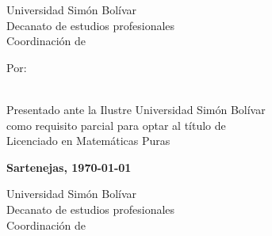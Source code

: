 \documentclass
[
  12pt,
  letterpaper,
  openany,
  oneside,
]{book}
\begin{document}
\frontmatter
\ifcaratula\newpage
\bgroup
    \centering
    \thispagestyle{empty}

    \PrintUsbLogo
    {
        { \normalfont\large Universidad Simón Bolívar }\\
        Decanato de estudios profesionales\\
        Coordinación de \coord
    }

    \vspace{4cm}

    \UppercaseBold{
        \wrapto[14cm][\centering]
        {\MainTitle}
    }

    \vspace{\fill}

    Por:
    \\
    \autor

    \vspace{\fill}

    \\
    Presentado ante la Ilustre Universidad Simón Bolívar\\
    como requisito parcial para optar al título de\\
    Licenciado en Matemáticas Puras

    \vspace{\fill}

    \textbf{Sartenejas, \today}\par
\egroup
\fi
\ifpaginatitulo\newpage
\bgroup
    \centering
    \thispagestyle{empty}

    \PrintUsbLogo
    {
        { \normalfont\large Universidad Simón Bolívar }\\
        Decanato de estudios profesionales\\
        Coordinación de \coord
    }

    \vspace{1.5cm}

    \UppercaseBold{
        \wrapto[14cm][\centering]
        {\MainTitle}
    }
\end{document}
